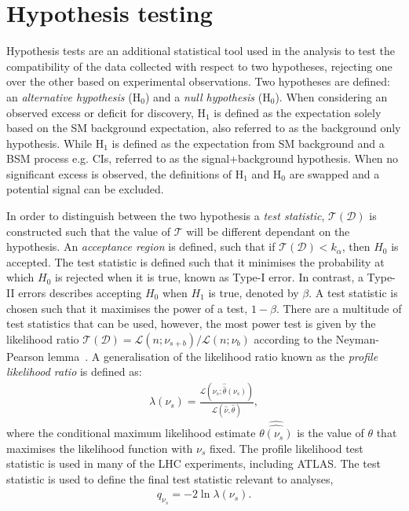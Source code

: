 \section{Hypothesis testing}
Hypothesis tests are an additional statistical tool used in the analysis to test the compatibility of the data collected with respect to two hypotheses, rejecting one over the other based on experimental observations. Two hypotheses are defined: an \emph{alternative hypothesis} ($\mathrm{H_0}$) and a \emph{null hypothesis} ($\mathrm{H_0}$). When considering an observed excess or deficit for discovery, $\mathrm{H_1}$ is defined as the expectation solely based on the SM background expectation, also referred to as the background only hypothesis. While $\mathrm{H_1}$ is defined as the expectation from SM background and a BSM process e.g. CIs, referred to as the signal+background hypothesis. When no significant excess is observed, the definitions of $\mathrm{H_1}$ and $\mathrm{H_0}$ are swapped and a potential signal can be excluded. 

In order to distinguish between the two hypothesis a \emph{test statistic}, $\mathcal{T}(\mathcal{D})$ is constructed such that the value of $\mathcal{T}$ will be different dependant on the hypothesis. An \emph{acceptance region} is defined, such that if $\mathcal{T}(\mathcal{D}) < k_\alpha$, then $H_0$ is accepted. The test statistic is defined such that it minimises the probability at which $H_0$ is rejected when it is true, known as Type-I error. In contrast, a Type-II errors describes accepting $H_0$ when $H_1$ is true, denoted by $\beta$. A test statistic is chosen such that it maximises the power of a test, $1-\beta$. There are a multitude of test statistics that can be used, however, the most power test is given by the likelihood ratio $\mathcal{T}(\mathcal{D}) = \mathcal{L}(n;\nu_{s+b})/\mathcal{L}(n;\nu_{b})$ according to the Neyman-Pearson lemma~\cite{Cowan1998}. A generalisation of the likelihood ratio known as the \emph{profile likelihood ratio} is defined as:
\begin{equation}
    \label{eq:profLL}
    \begin{aligned}
        \lambda(\nu_s) = \frac{\mathcal{L}(\nu_s;\hat{\hat{\theta}}(\nu_s))}{\mathcal{L}(\hat{\nu},\hat{\theta})},
    \end{aligned}
\end{equation}
where the conditional maximum likelihood estimate $\hat{\hat{\theta(\nu_s)}}$ is the value of $\theta$ that maximises the likelihood function with $\nu_s$ fixed. The profile likelihood test statistic is used in many of the LHC experiments, including ATLAS. The test statistic is used to define the final test statistic relevant to analyses,
\begin{equation}
    \label{eq:teststat}
    \begin{aligned}
        q_{\nu_s} = -2\ln\lambda(\nu_s).
    \end{aligned}
\end{equation}

